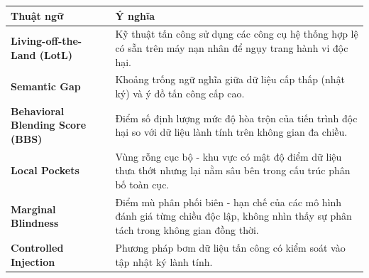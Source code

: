 \documentclass[../main.tex]{subfiles}
\begin{document}
\begin{longtable}{l p{10cm}}
	\hline
   \textbf{Thuật ngữ}  & \textbf{Ý nghĩa} \\ \hline 
	\textbf{Living-off-the-Land (LotL)} & Kỹ thuật tấn công sử dụng các công cụ hệ thống hợp lệ có sẵn trên máy nạn nhân để ngụy trang hành vi độc hại. \\
	\textbf{Semantic Gap} & Khoảng trống ngữ nghĩa giữa dữ liệu cấp thấp (nhật ký) và ý đồ tấn công cấp cao. \\
	\textbf{Behavioral Blending Score (BBS)} & Điểm số định lượng mức độ hòa trộn của tiến trình độc hại so với dữ liệu lành tính trên không gian đa chiều. \\
	\textbf{Local Pockets} & Vùng rỗng cục bộ - khu vực có mật độ điểm dữ liệu thưa thớt nhưng lại nằm sâu bên trong cấu trúc phân bố toàn cục. \\
	\textbf{Marginal Blindness} & Điểm mù phân phối biên - hạn chế của các mô hình đánh giá từng chiều độc lập, không nhìn thấy sự phân tách trong không gian đồng thời. \\
    \textbf{Controlled Injection}  &  Phương pháp bơm dữ liệu tấn công có kiểm soát vào tập nhật ký lành tính. \\

    \hline
\end{longtable}
\end{document}
